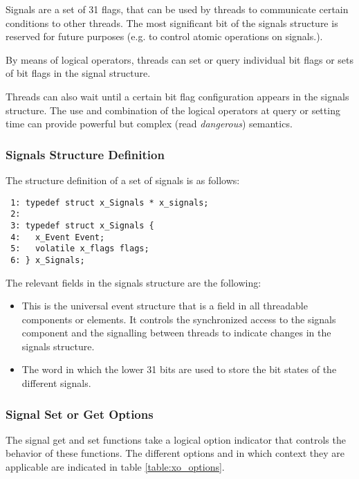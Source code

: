 Signals are a set of 31 flags, that can be used by threads to communicate certain
conditions to other threads. The most significant bit of the signals
structure is reserved for future purposes (e.g. to control atomic operations
on signals.).

By means of logical operators, threads can set or query individual bit flags
or sets of bit flags in the signal structure.

Threads can also wait until a certain bit flag configuration appears in the
signals structure. The use and combination of the logical operators at query
or setting time can provide powerful but complex (read \textit{dangerous}) semantics.

\subsubsection{Signals Structure Definition}

The structure definition of a set of signals is as follows:

\bcode
\begin{verbatim}
 1: typedef struct x_Signals * x_signals;
 2:
 3: typedef struct x_Signals {
 4:   x_Event Event;
 5:   volatile x_flags flags;
 6: } x_Signals;
\end{verbatim}
\ecode

The relevant fields in the signals structure are the following:

\begin{itemize}
\item {} This is the universal event structure that is a field
in all threadable components or elements. It controls the synchronized access
to the signals component and the signalling between threads to indicate changes
in the signals structure.
\item {} The word in which the lower 31
bits are used to store the bit states of the different signals.
\end{itemize}


\subsubsection{Signal Set or Get Options}

The signal get and set functions take a logical option indicator that
controls the behavior of these functions. The different options and
in which context they are applicable are indicated in table
\ref{table:xo_options}.


